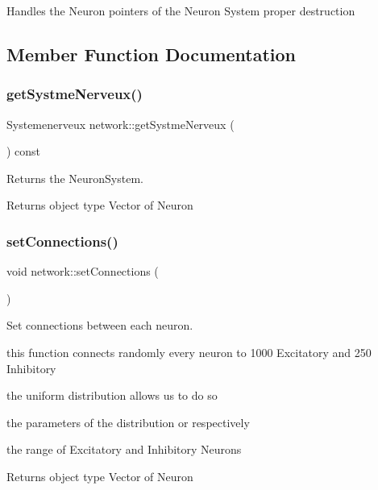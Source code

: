 Handles the Neuron pointers of the Neuron System proper destruction 

\subsection{Member Function Documentation}
\mbox{\label{classnetwork_af0a14e17b85528ee182e35127de7e2b5}} 
\subsubsection{\texorpdfstring{get\+Systme\+Nerveux()}{getSystmeNerveux()}}
{\footnotesize\ttfamily Systemenerveux network\+::get\+Systme\+Nerveux (\begin{DoxyParamCaption}{ }\end{DoxyParamCaption}) const}



Returns the Neuron\+System. 

\begin{DoxyReturn}{Returns}
object type Vector of Neuron 
\end{DoxyReturn}
\mbox{\label{classnetwork_acf46b197f5e56df426dc3f105add3e97}} 
\subsubsection{\texorpdfstring{set\+Connections()}{setConnections()}}
{\footnotesize\ttfamily void network\+::set\+Connections (\begin{DoxyParamCaption}{ }\end{DoxyParamCaption})}



Set connections between each neuron. 

this function connects randomly every neuron to 1000 Excitatory and 250 Inhibitory

the uniform distribution allows us to do so

the parameters of the distribution or respectively

the range of Excitatory and Inhibitory Neurons

\begin{DoxyReturn}{Returns}
object type Vector of Neuron 
\end{DoxyReturn}
\mbox{\label{classnetwork_adec3ef8128235b2dc6d4d9df34e211b7}} 
